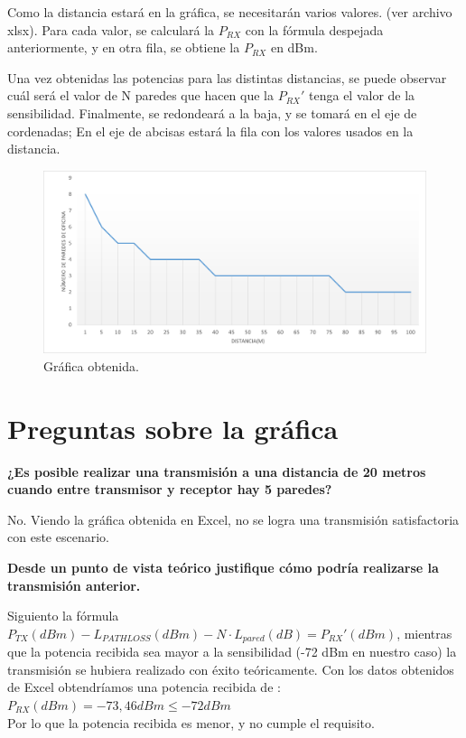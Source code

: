\documentclass{article}
\begin{document}
Como la distancia estará en la gráfica, se necesitarán varios valores. (ver archivo xlsx).
Para cada valor, se calculará la $P_{RX}$ con la fórmula despejada anteriormente, y en otra fila, se obtiene la $P_{RX}$ en dBm.

Una vez obtenidas las potencias para las distintas distancias, se puede observar cuál será el valor de N paredes que hacen que la $P_{RX}'$ tenga el valor de la sensibilidad. Finalmente, se redondeará a la baja, y se tomará en el eje de cordenadas; En el eje de abcisas estará la fila con los valores usados en la distancia.

\begin{figure}[h]
      \centering
      \includegraphics[width=0.6\linewidth]{grafica paredes.png}
      \caption{\label{fig:grafic} Gráfica obtenida.}
\end{figure}

\newpage

\section{Preguntas sobre la gráfica}

\textbf{¿Es posible realizar una transmisión a una distancia de 20 metros cuando entre transmisor y
receptor hay 5 paredes?}



No. Viendo la gráfica obtenida en Excel, no se logra una transmisión satisfactoria con este escenario. 

\quad

\textbf{Desde un punto de vista teórico justifique cómo podría realizarse la transmisión anterior.}

Siguiento la fórmula $P_{TX}(dBm)-L_{PATHLOSS}(dBm)- N \cdot L_{pared}(dB)=P_{RX}'(dBm)$, mientras que la potencia recibida sea mayor a la sensibilidad (-72 dBm en nuestro caso) la transmisión se hubiera realizado con éxito teóricamente. Con los datos obtenidos de Excel obtendríamos una potencia recibida de : $P_{RX}(dBm)=-73,46 dBm\leq -72 dBm$ \\ Por lo que la potencia recibida es menor, y no cumple el requisito.
\end{document}
